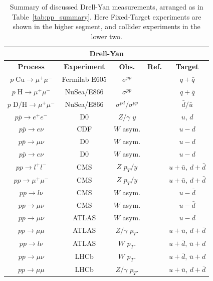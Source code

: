 \documentclass[12pt,oneside,openright]{report}
\begin{document}
\begin{spacing}{1.5}
\begin{table}
\begin{center}
\begin{tabular}{|c|c|c|c|c|}
\hline
\multicolumn{5}{|c|}{\textbf{Drell-Yan}}\\
\hline
\textbf{Process} & \textbf{Experiment} & \textbf{Obs.} &\textbf{Ref.} &  \textbf{Target} \\
\hline\hline
$p\; \mathrm{ Cu} \to \mu^+ \mu^- $ & Fermilab E605 & $\sigma^{pp}$ & \cite{Moreno:1990sf} & $q+\bar{q}$\\
\hline
$p\; \mathrm{ H} \to \mu^+ \mu^- $ & NuSea/E866 & $\sigma^{pp}$ & \cite{Webb:2003bj}&  $q+\bar{q}$\\
$p\; \mathrm{ D/H} \to \mu^+ \mu^- $ & NuSea/E866 & $\sigma^{pd}/\sigma^{pp}$ & \cite{Towell:2001nh}& $\bar{d}/\bar{u}$ \\
\hline
\hline
$p\bar{p} \to e^+ e^- $ & D0 & $Z/\gamma$ $y$ & \cite{Abazov:2007jy}& $u$, $d$ \\
$p\bar{p} \to e \nu $ & CDF & $W$ asym. & \cite{Acosta:2005ud}& $u-d$  \\
$p\bar{p} \to \mu \nu $ & D0 & $W$ asym. & \cite{Abazov:2007pm}&  $u-d$ \\
$p\bar{p} \to e \nu $ & D0 & $W$ asym. & \cite{Abazov:2008qv}& $u-d$  \\
\hline
\hline
$pp \to l^+ l^- $ & CMS & $Z$ $p_T/y$ & \cite{Chatrchyan:2011wt}& $u + \bar{u}$, $d + \bar{d}$ \\
$pp \to \mu^+ \mu^- $ & CMS & $Z$ $p_T/y$ & \cite{CMS-PAS-SMP-12-025,CMS-PAS-SMP-13-013}&  $u + \bar{u}$, $d + \bar{d}$\\
$pp \to l \nu $ & CMS & $W$ asym. & \cite{Chatrchyan:2011jz}&  $u-\bar{d}$\\
$pp \to \mu \nu $ & CMS & $W$ asym. & \cite{Chatrchyan:2012xt,Chatrchyan:2013mza} & $u-\bar{d}$ \\
\hline
$pp \to \mu  \nu $ & ATLAS & $W$ asym. & \cite{Aad:2011yna} &  $u-\bar{d}$\\
$pp \to \mu  \mu $ & ATLAS & $Z/\gamma$ $p_T$. & \cite{Aad:2011gj}&  $u + \bar{u}$, $d + \bar{d}$\\
$pp \to l  \nu $ & ATLAS & $W$ $p_T$. & \cite{Aad:2011fp} & $u+\bar{d}$, $\bar{u} + d$  \\
\hline
$pp \to \mu  \nu $ & LHCb & $W$ $p_T$. & \cite{Aaij:2012vn} &  $u+\bar{d}$, $\bar{u} + d$\\
$pp \to \mu  \mu $ & LHCb & $Z/\gamma$ $p_T$. & \cite{Aaij:2012vn}& $u + \bar{u}$, $d + \bar{d}$ \\
\hline
\end{tabular}
\end{center}
\caption{Summary of discussed Drell-Yan measurements, arranged as in Table~\ref{tab:pp_summary}. Here Fixed-Target experiments are shown in the higher segment, and collider experiments in the lower two.}
\label{tab:FTDY_summary}
\end{table}%


\end{spacing}
\end{document}
